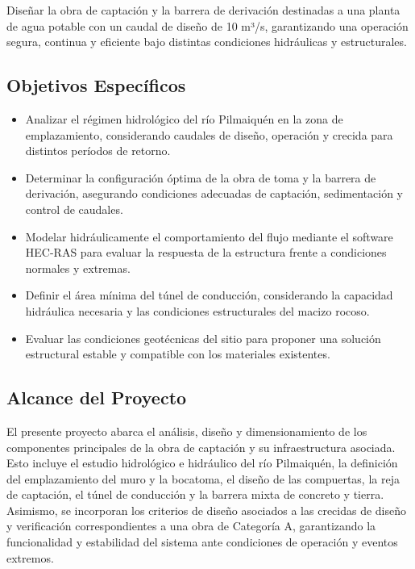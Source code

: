 \documentclass{article} %
\begin{document}
Diseñar la obra de captación y la barrera de derivación destinadas a una planta de agua potable con un caudal de diseño de 10 m³/s, garantizando una operación segura, continua y eficiente bajo distintas condiciones hidráulicas y estructurales.

\subsection{Objetivos Específicos}

\begin{itemize}
    \item Analizar el régimen hidrológico del río Pilmaiquén en la zona de emplazamiento, considerando caudales de diseño, operación y crecida para distintos períodos de retorno.
    \item Determinar la configuración óptima de la obra de toma y la barrera de derivación, asegurando condiciones adecuadas de captación, sedimentación y control de caudales.
    \item Modelar hidráulicamente el comportamiento del flujo mediante el software HEC-RAS para evaluar la respuesta de la estructura frente a condiciones normales y extremas.
    \item Definir el área mínima del túnel de conducción, considerando la capacidad hidráulica necesaria y las condiciones estructurales del macizo rocoso.
    \item Evaluar las condiciones geotécnicas del sitio para proponer una solución estructural estable y compatible con los materiales existentes.
\end{itemize}

\subsection{Alcance del Proyecto}

El presente proyecto abarca el análisis, diseño y dimensionamiento de los componentes principales de la obra de captación y su infraestructura asociada. Esto incluye el estudio hidrológico e hidráulico del río Pilmaiquén, la definición del emplazamiento del muro y la bocatoma, el diseño de las compuertas, la reja de captación, el túnel de conducción y la barrera mixta de concreto y tierra. Asimismo, se incorporan los criterios de diseño asociados a las crecidas de diseño y verificación correspondientes a una obra de Categoría A, garantizando la funcionalidad y estabilidad del sistema ante condiciones de operación y eventos extremos.
\end{document}

